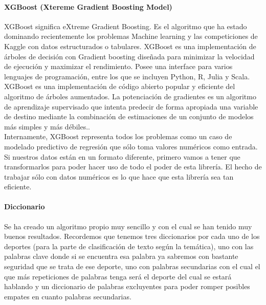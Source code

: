 \documentclass[../all.tex]{subfiles}
\begin{document}
    	\paragraph{XGBoost (Xtereme Gradient Boosting Model)}

			XGBoost significa eXtreme Gradient Boosting. Es el algoritmo que ha estado dominando recientemente los problemas Machine learning y las competiciones de Kaggle con datos estructurados o tabulares. XGBoost es una implementación de árboles de decisión con Gradient boosting diseñada para minimizar la velocidad de ejecución y maximizar el rendimiento. Posee una interface para varios lenguajes de programación, entre los que se incluyen Python, R, Julia y Scala.\\
			
			XGBoost es una implementación de código abierto popular y eficiente del algoritmo de árboles aumentados. La potenciación de gradientes es un algoritmo de aprendizaje supervisado que intenta predecir de forma apropiada una variable de destino mediante la combinación de estimaciones de un conjunto de modelos más simples y más débiles.\cite{XGBoost}.\\
			
			Internamente, XGBoost representa todos los problemas como un caso de modelado predictivo de regresión que sólo toma valores numéricos como entrada. Si nuestros datos están en un formato diferente, primero vamos a tener que transformarlos para poder hacer uso de todo el poder de esta librería. El hecho de trabajar sólo con datos numéricos es lo que hace que esta librería sea tan eficiente.
		 
		 \paragraph{Diccionario}
		
			Se ha creado un algoritmo propio muy sencillo y con el cual se han tenido muy buenos resultados. Recordemos que tenemos tres diccionarios por cada uno de los deportes (para la parte de clasificación de texto según la temática), uno con las palabras clave donde si se encuentra esa palabra ya sabremos con bastante seguridad que se trata de ese deporte, uno con palabras secundarias con el cual el que más repeticiones de palabras tenga será el deporte del cual se estará hablando y un diccionario de palabras excluyentes para poder romper posibles empates en cuanto palabras secundarias.
		


\newpage
\end{document}
